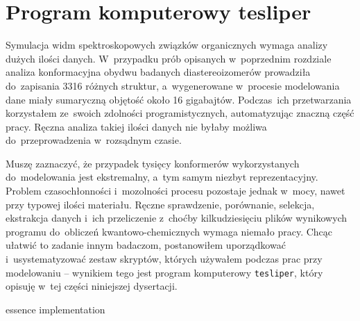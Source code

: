 \chapter{Program komputerowy tesliper}\label{chapter:tesliper}
Symulacja widm spektroskopowych związków organicznych wymaga analizy dużych ilości danych.
W~przypadku prób opisanych w~poprzednim rozdziale
  analiza konformacyjna obydwu badanych diastereoizomerów prowadziła do~zapisania 3316 różnych struktur, a~wygenerowane w~procesie modelowania
  dane miały sumaryczną objętość około 16 gigabajtów.
Podczas~ich przetwarzania korzystałem ze~swoich zdolności programistycznych, automatyzując
  znaczną część pracy.
Ręczna analiza takiej ilości danych nie byłaby możliwa do~przeprowadzenia w~rozsądnym czasie.

Muszę zaznaczyć, że przypadek tysięcy konformerów wykorzystanych do~modelowania jest
  ekstremalny, a~tym samym niezbyt reprezentacyjny.
Problem czasochłonności i~mozolności procesu pozostaje jednak w~mocy,
  nawet przy typowej ilości materiału.
Ręczne sprawdzenie, porównanie, selekcja, ekstrakcja danych i~ich przeliczenie z~choćby
  kilkudziesięciu plików wynikowych programu do~obliczeń kwantowo-chemicznych wymaga
  niemało pracy.
Chcąc ułatwić to zadanie innym badaczom, postanowiłem uporządkować i~usystematyzować
  zestaw skryptów, których używałem podczas prac przy modelowaniu \--- wynikiem tego jest
  program komputerowy \texttt{tesliper}, który opisuję w~tej części niniejszej dysertacji.

{essence}
{implementation}
